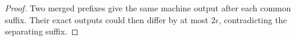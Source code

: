 \begin{proof}
Two merged prefixes give the same machine output after each common
suffix. Their exact outputs could then differ by at most $2\epsilon$,
contradicting the separating suffix.
\end{proof}
